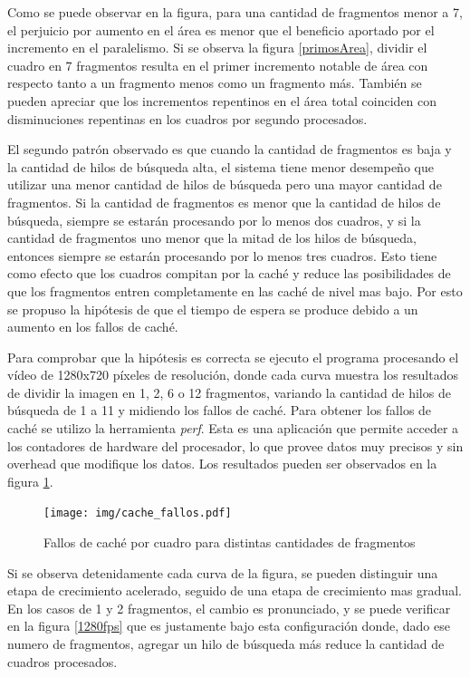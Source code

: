 Como se puede observar en la figura, para una cantidad de fragmentos menor a 7,
el perjuicio por aumento en el área es menor que el beneficio aportado por el
incremento en el paralelismo. Si se observa la figura \ref{primosArea}, dividir
el cuadro en 7 fragmentos resulta en el primer incremento notable de área con
respecto tanto a un fragmento menos como un fragmento más. También se pueden
apreciar que los incrementos repentinos en el área total coinciden con
disminuciones repentinas en los cuadros por segundo procesados.

El segundo patrón observado es que cuando la cantidad de fragmentos es baja y la
cantidad de hilos de búsqueda alta, el sistema tiene menor desempeño que
utilizar una menor cantidad de hilos de búsqueda pero una mayor cantidad de
fragmentos. Si la cantidad de fragmentos es menor que la cantidad de hilos de
búsqueda, siempre se estarán procesando por lo menos dos cuadros, y si la
cantidad de fragmentos uno menor que la mitad de los hilos de búsqueda, entonces
siempre se estarán procesando por lo menos tres cuadros. Esto tiene como efecto
que los cuadros compitan por la caché y reduce las posibilidades de que los
fragmentos entren completamente en las caché de nivel mas bajo. Por esto se
propuso la hipótesis de que el tiempo de espera se produce debido a un aumento
en los fallos de caché.

Para comprobar que la hipótesis es correcta se ejecuto el programa procesando el
vídeo de 1280x720 píxeles de resolución, donde cada curva muestra los resultados
de dividir la imagen en 1, 2, 6 o 12 fragmentos, variando la cantidad de hilos
de búsqueda de 1 a 11 y midiendo los fallos de caché. Para obtener los fallos de
caché se utilizo la herramienta \emph{perf}. Esta es una aplicación que permite
acceder a los contadores de hardware del procesador, lo que provee datos muy
precisos y sin overhead que modifique los datos. Los resultados pueden ser
observados en la figura \ref{cacheFallos}.

\begin{figure}[!h]

	\texttt{[image: img/cache\_fallos.pdf]}
	\caption{Fallos de caché por cuadro para distintas cantidades de
	fragmentos}
	\label{cacheFallos}

\end{figure}

Si se observa detenidamente cada curva de la figura, se pueden distinguir una
etapa de crecimiento acelerado, seguido de una etapa de crecimiento mas gradual.
En los casos de 1 y 2 fragmentos, el cambio es pronunciado, y se puede verificar
en la figura \ref{1280fps} que es justamente bajo esta configuración donde, dado
ese numero de fragmentos, agregar un hilo de búsqueda más reduce la cantidad de
cuadros procesados.

